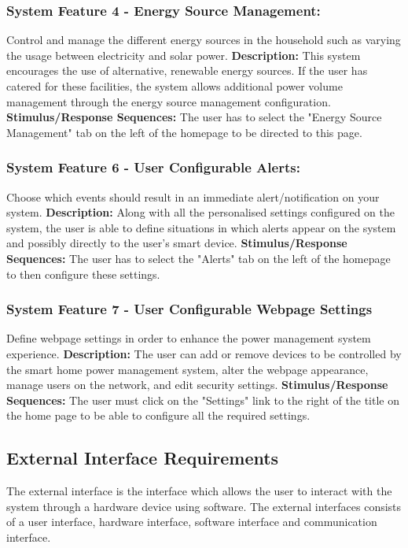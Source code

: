 \documentclass[10pt,twocolumn]{witseiepaper}
\begin{document}
	\subsubsection{System Feature 4 - Energy Source Management:}
	Control and manage the different energy sources in the household such as varying the usage between electricity and solar power.
	\newline 
	\textbf{Description:}
	This system encourages the use of alternative, renewable energy sources. If the user has catered for these facilities, the system allows additional power volume management through the energy source management configuration. 
	\newline
	\textbf{Stimulus/Response Sequences:}
	The user has to select the "Energy Source Management" tab on the left of the homepage to be directed to this page. 
	\subsubsection{System Feature 6 - User Configurable Alerts:} 
	Choose which events should result in an immediate alert/notification on your system.
	\newline 
	\textbf{Description:}
	Along with all the personalised settings configured on the system, the user is able to define situations in which alerts appear on the system and possibly directly to the user's smart device. 
	\newline
	\textbf{Stimulus/Response Sequences:}
	The user has to select the "Alerts" tab on the left of the homepage to then configure these settings.
	\subsubsection{System Feature 7 - User Configurable Webpage Settings} 
	Define webpage settings in order to enhance the power management system experience.
	\newline
	\textbf{Description:}
	The user can add or remove devices to be controlled by the smart home power management system, alter the webpage appearance, manage users on the network, and edit security settings. 
	\newline
	\textbf{Stimulus/Response Sequences:}
	The user must click on the "Settings" link to the right of the title on the home page to be able to configure all the required settings.
	
	\subsection{External Interface Requirements}
	The external interface is the interface which allows the user to interact with the system through a hardware device using software. The external interfaces consists of a user interface, hardware interface, software interface and communication interface. 
	
\end{document}
